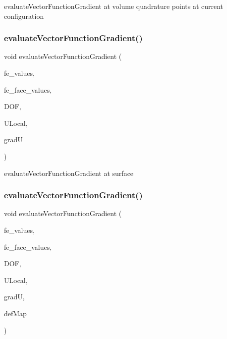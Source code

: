 evaluate\+Vector\+Function\+Gradient at volume quadrature points at current configuration \mbox{\label{group___evaluation_functions_gab2771d18ff704decbbc12ca2b848bbfe}} 
\subsubsection{\texorpdfstring{evaluate\+Vector\+Function\+Gradient()}{evaluateVectorFunctionGradient()}\hspace{0.1cm}{\footnotesize\ttfamily [3/4]}}
{\footnotesize\ttfamily void evaluate\+Vector\+Function\+Gradient (\begin{DoxyParamCaption}\item[{const F\+E\+Values$<$ dim $>$ \&}]{fe\+\_\+values,  }\item[{const F\+E\+Face\+Values$<$ dim $>$ \&}]{fe\+\_\+face\+\_\+values,  }\item[{unsigned int}]{D\+OF,  }\item[{Table$<$ 1, T $>$ \&}]{U\+Local,  }\item[{Table$<$ 3, T $>$ \&}]{gradU }\end{DoxyParamCaption})}

evaluate\+Vector\+Function\+Gradient at surface \mbox{\label{group___evaluation_functions_ga9608539d601a91aff1ba01ccc720fbe0}} 
\subsubsection{\texorpdfstring{evaluate\+Vector\+Function\+Gradient()}{evaluateVectorFunctionGradient()}\hspace{0.1cm}{\footnotesize\ttfamily [4/4]}}
{\footnotesize\ttfamily void evaluate\+Vector\+Function\+Gradient (\begin{DoxyParamCaption}\item[{const F\+E\+Values$<$ dim $>$ \&}]{fe\+\_\+values,  }\item[{const F\+E\+Face\+Values$<$ dim $>$ \&}]{fe\+\_\+face\+\_\+values,  }\item[{unsigned int}]{D\+OF,  }\item[{Table$<$ 1, T $>$ \&}]{U\+Local,  }\item[{Table$<$ 3, T $>$ \&}]{gradU,  }\item[{\mbox{\hyperlink{structdeformation_map}{deformation\+Map}}$<$ T, dim $>$ \&}]{def\+Map }\end{DoxyParamCaption})}

